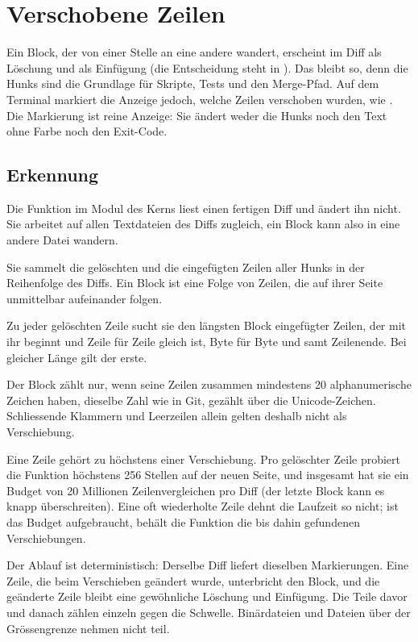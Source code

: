 \section[sec:moved]{Verschobene Zeilen}

Ein Block, der von einer Stelle an eine andere wandert, erscheint im Diff als Löschung und als
Einfügung (die Entscheidung steht in ).
Das bleibt so, denn die Hunks sind die Grundlage für
Skripte, Tests und den Merge-Pfad. Auf dem Terminal markiert die Anzeige jedoch, welche Zeilen
verschoben wurden, wie . Die Markierung ist reine Anzeige: Sie
ändert weder die Hunks noch den Text ohne Farbe noch den Exit-Code.

\subsection{Erkennung}

Die Funktion  im Modul  des Kerns liest einen fertigen Diff und
ändert ihn nicht. Sie arbeitet auf allen Textdateien des Diffs zugleich, ein Block kann also
in eine andere Datei wandern.

\startitemize[n]
\item Sie sammelt die gelöschten und die eingefügten Zeilen aller Hunks in der Reihenfolge des
Diffs. Ein Block ist eine Folge von Zeilen, die auf ihrer Seite unmittelbar aufeinander folgen.
\item Zu jeder gelöschten Zeile sucht sie den längsten Block eingefügter Zeilen, der mit ihr
beginnt und Zeile für Zeile gleich ist, Byte für Byte und samt Zeilenende.
Bei gleicher Länge gilt der erste.
\item Der Block zählt nur, wenn seine Zeilen zusammen mindestens 20 alphanumerische Zeichen
haben, dieselbe Zahl wie in Git, gezählt über die Unicode-Zeichen.
Schliessende Klammern und Leerzeilen allein gelten deshalb nicht als Verschiebung.
\item Eine Zeile gehört zu höchstens einer Verschiebung. Pro gelöschter Zeile probiert die
Funktion höchstens 256 Stellen auf der neuen Seite, und insgesamt hat sie ein Budget von
20 Millionen Zeilenvergleichen pro Diff (der letzte Block kann es knapp überschreiten).
Eine oft wiederholte Zeile dehnt die Laufzeit so nicht;
ist das Budget aufgebraucht, behält die Funktion die bis dahin gefundenen Verschiebungen.
\stopitemize

Der Ablauf ist deterministisch: Derselbe Diff liefert dieselben Markierungen.
Eine Zeile, die beim Verschieben geändert wurde, unterbricht den Block, und die geänderte
Zeile bleibt eine gewöhnliche Löschung und Einfügung.
Die Teile davor und danach zählen einzeln gegen die Schwelle.
Binärdateien und Dateien über der Grössengrenze nehmen nicht teil.

